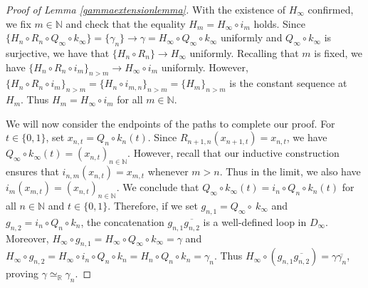 \documentclass[12pt, leqno]{amsart}
\newcommand{\den}{\simeq_{\bbr}}
\newcommand{\bbn}{\mathbb{N}}
\newcommand{\bbr}{\mathbb{R}}
\newcommand{\ov}{\overline}
\theoremstyle{definition}\newtheorem{definition}[theorem]{Definition}
\begin{document}
\begin{proof}[Proof of Lemma \ref{gammaextensionlemma}]
With the existence of $H_{\infty}$ confirmed, we fix $m\in\bbn$ and check that the equality $H_m=H_{\infty}\circ i_m$ holds. Since $\{H_n\circ R_n\circ Q_{\infty}\circ k_{\infty}\}=\{\gamma_n\}\to \gamma=H_{\infty}\circ Q_{\infty}\circ k_{\infty}$ uniformly and $Q_{\infty}\circ k_{\infty}$ is surjective, we have that $\{H_n\circ R_n\}\to H_{\infty}$ uniformly. Recalling that $m$ is fixed, we have $\{H_n\circ R_n\circ i_{m}\}_{n>m}\to H_{\infty}\circ i_m$ uniformly. However, $\{H_n\circ R_n\circ i_{m}\}_{n>m}=\{H_n\circ i_{m,n}\}_{n>m}=\{H_m\}_{n>m}$ is the constant sequence at $H_m$. Thus $H_m=H_{\infty}\circ i_m$ for all $m\in\bbn$.

We will now consider the endpoints of the paths to complete our proof.  For $t\in\{0,1\}$, set $ x_{n,t}=Q_n\circ k_{n}(t)$. Since $R_{n+1,n}(x_{n+1,t})=x_{n,t}$, we have $Q_{\infty}\circ k_{\infty}(t)=(x_{n,t})_{n\in\bbn}$. However, recall that our inductive construction ensures that $i_{n,m}(x_{n,t})=x_{m,t}$ whenever $m>n$. Thus in the limit, we also have $i_{m}(x_{m,t})=(x_{n,t})_{n\in\bbn}$. We conclude that $Q_{\infty}\circ k_{\infty}(t)=i_n\circ Q_n\circ k_{n}(t)$ for all $n\in\bbn$ and $t\in \{0,1\}$. Therefore, if we set $g_{n,1}=Q_{\infty}\circ \ k_{\infty}$ and $g_{n,2}=i_n\circ Q_n\circ k_{n}$, the concatenation $g_{n,1} \ov{g_{n,2}}$ is a well-defined loop in $D_{\infty}$. Moreover, $H_{\infty}\circ g_{n,1}=H_{\infty}\circ Q_{\infty}\circ  k_{\infty}=\gamma$ and $H_{\infty}\circ g_{n,2}=H_{\infty}\circ i_n\circ Q_n\circ k_{n}=H_n\circ Q_n\circ k_{n}=\gamma_n$. Thus $H_{\infty}\circ(g_{n,1}\ov{g_{n,2}})=\gamma\ov{\gamma_{n}}$, proving $\gamma\den\gamma_n$.
\end{proof}
\end{document}
